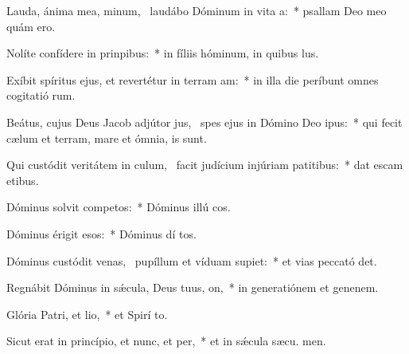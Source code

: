\item Lauda, ánima mea, minum,~\pscross{} laudábo Dóminum in vita a:~* psallam Deo meo quám ero.
\item Nolíte confídere in prinpibus:~* in fíliis hóminum, in quibus   lus.
\item Exíbit spíritus ejus, et revertétur in terram am:~* in illa die períbunt omnes cogitatió rum.
\item Beátus, cujus Deus Jacob adjútor jus,~\pscross{} spes ejus in Dómino Deo ipus:~* qui fecit cælum et terram, mare et ómnia,   is sunt.
\item Qui custódit veritátem in culum,~\pscross{} facit judícium injúriam patitibus:~* dat escam etibus.
\item Dóminus solvit competos:~* Dóminus illú cos.
\item Dóminus érigit esos:~* Dóminus dí tos.
\item Dóminus custódit venas,~\pscross{} pupíllum et víduam supiet:~* et vias peccató det.
\item Regnábit Dóminus in sǽcula, Deus tuus, on,~* in generatiónem et genenem.
\item Glória Patri, et lio,~* et Spirí to.
\item Sicut erat in princípio, et nunc, et per,~* et in sǽcula sæcu. men.
